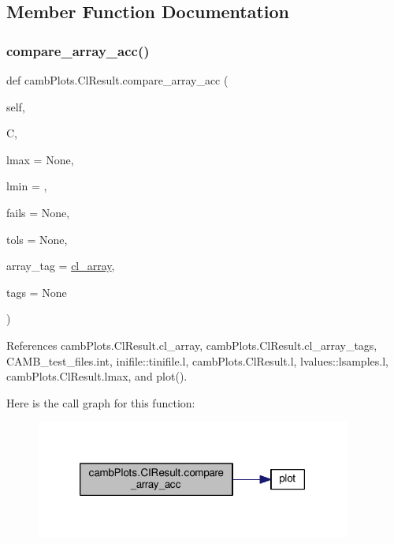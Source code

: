 \subsection{Member Function Documentation}
\mbox{\label{classcambPlots_1_1ClResult_a40650762890a6120cc294d54cac15e36}} 
\subsubsection{\texorpdfstring{compare\+\_\+array\+\_\+acc()}{compare\_array\_acc()}}
{\footnotesize\ttfamily def camb\+Plots.\+Cl\+Result.\+compare\+\_\+array\+\_\+acc (\begin{DoxyParamCaption}\item[{}]{self,  }\item[{}]{C,  }\item[{}]{lmax = {\ttfamily None},  }\item[{}]{lmin = {},  }\item[{}]{fails = {\ttfamily None},  }\item[{}]{tols = {\ttfamily None},  }\item[{}]{array\+\_\+tag = {\ttfamily \textquotesingle{}\mbox{\hyperlink{classcambPlots_1_1ClResult_a47706b8004a10920546cd73bfd8f6e16}{cl\+\_\+array}}\textquotesingle{}},  }\item[{}]{tags = {\ttfamily None} }\end{DoxyParamCaption})}



References camb\+Plots.\+Cl\+Result.\+cl\+\_\+array, camb\+Plots.\+Cl\+Result.\+cl\+\_\+array\+\_\+tags, C\+A\+M\+B\+\_\+test\+\_\+files.\+int, inifile\+::tinifile.\+l, camb\+Plots.\+Cl\+Result.\+l, lvalues\+::lsamples.\+l, camb\+Plots.\+Cl\+Result.\+lmax, and plot().

Here is the call graph for this function\+:
\nopagebreak
\begin{figure}[H]
\begin{center}
\leavevmode
\includegraphics[width=294pt]{classcambPlots_1_1ClResult_a40650762890a6120cc294d54cac15e36_cgraph}
\end{center}
\end{figure}
\mbox{\label{classcambPlots_1_1ClResult_ab744582b8633917fcd8c8d45cb0fa3c4}} 
